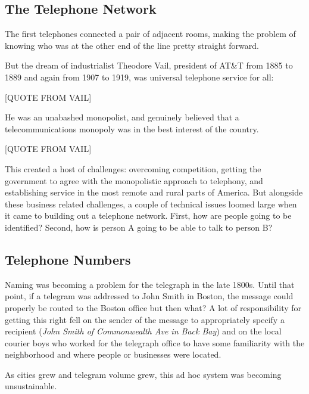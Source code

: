 \documentclass[UTF8]{book}
\begin{document}
\begin{CJK}{UTF8}{gbsn}
\chapter{The Telephone Network}

The first telephones connected a pair of adjacent rooms, making the problem of knowing who was at the other end of the line pretty straight forward.

But the dream of industrialist Theodore Vail, president of AT\&T from 1885 to 1889 and again from 1907 to 1919, was universal telephone service for all:

[QUOTE FROM VAIL]

He was an unabashed monopolist, and genuinely believed that a telecommunications monopoly was in the best interest of the country.

[QUOTE FROM VAIL]

This created a host of challenges: overcoming competition, getting the government to agree with the monopolistic approach to telephony, and establishing service in the most remote and rural parts of America. But alongside these business related challenges, a couple of technical issues loomed large when it came to building out a telephone network. First, how are people going to be identified? Second, how is person A going to be able to talk to person B?

\section{Telephone Numbers}

Naming was becoming a problem for the telegraph in the late 1800s. Until that point, if a telegram was addressed to John Smith in Boston, the message could properly be routed to the Boston office but then what? A lot of responsibility for getting this right fell on the sender of the message to appropriately specify a recipient (\emph{John Smith of Commonwealth Ave in Back Bay}) and on the local courier boys who worked for the telegraph office to have some familiarity with the neighborhood and where people or businesses were located.

As cities grew and telegram volume grew, this ad hoc system was becoming unsustainable.



\end{CJK}
\end{document}
